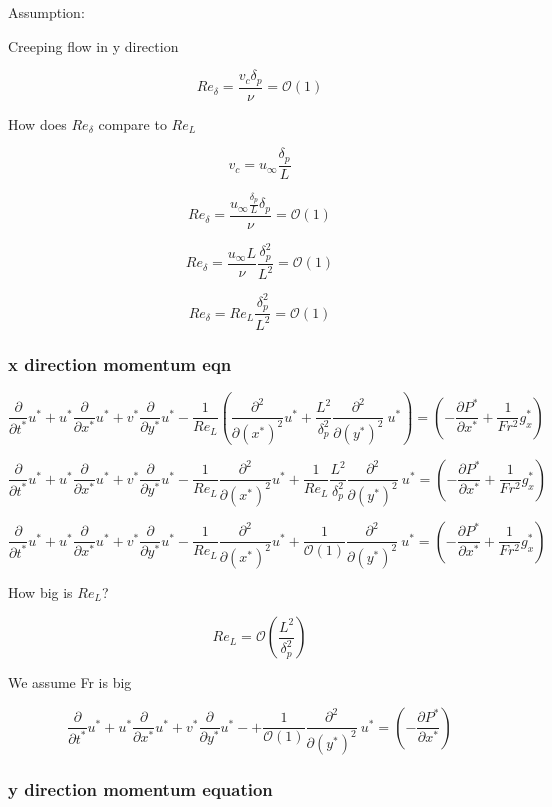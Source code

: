 \documentclass[11pt]{article}
\begin{document}
Assumption:

Creeping flow in y direction

$$Re_\delta = \frac{v_c \delta_p}{\nu} = \mathcal{O}(1)$$

How does $Re_\delta$ compare to $Re_L$

$$v_c = u_\infty \frac{\delta_p}{L}$$

$$Re_\delta = \frac{u_\infty \frac{\delta_p}{L} \delta_p}{\nu} = \mathcal{O}(1)$$

$$Re_\delta = \frac{u_\infty  L}{\nu} \frac{\delta_p^2}{L^2} = \mathcal{O}(1)$$

$$Re_\delta = Re_L \frac{\delta_p^2}{L^2} = \mathcal{O}(1)$$

\subsubsection{x direction momentum eqn}

$$\frac{\partial }{\partial t^*} u^* + u^*  \frac{\partial}{\partial x^* } u^* + v^*  \frac{\partial}{\partial y^*} u^* - \frac{1}{Re_L}  ( \frac{\partial^2}{\partial (x^*)^2} u^* + \frac{L^2}{\delta_p^2} \frac{\partial^2}{\partial (y^*)^2} \ u^* ) =  ( -  \frac{\partial P^*}{\partial x^*} + \frac{1}{Fr^2}g_x^* )$$

$$\frac{\partial }{\partial t^*} u^* + u^*  \frac{\partial}{\partial x^* } u^* + v^*  \frac{\partial}{\partial y^*} u^* -   \frac{1}{Re_L} \frac{\partial^2}{\partial (x^*)^2} u^* + \frac{1}{Re_L} \frac{L^2}{\delta_p^2} \frac{\partial^2}{\partial (y^*)^2} \ u^*  =  ( -  \frac{\partial P^*}{\partial x^*} + \frac{1}{Fr^2}g_x^* )$$

$$\frac{\partial }{\partial t^*} u^* + u^*  \frac{\partial}{\partial x^* } u^* + v^*  \frac{\partial}{\partial y^*} u^* -   \frac{1}{Re_L} \frac{\partial^2}{\partial (x^*)^2} u^* + \frac{1}{\mathcal{O}(1)} \frac{\partial^2}{\partial (y^*)^2} \ u^*  =  ( -  \frac{\partial P^*}{\partial x^*} + \frac{1}{Fr^2}g_x^* )$$

How big is $Re_L$?

$$Re_L = \mathcal{O} (\frac{L^2}{\delta_p^2})$$

We assume Fr is big 

$$\frac{\partial }{\partial t^*} u^* + u^*  \frac{\partial}{\partial x^* } u^* + v^*  \frac{\partial}{\partial y^*} u^* -  + \frac{1}{\mathcal{O}(1)} \frac{\partial^2}{\partial (y^*)^2} \ u^*  =  ( -  \frac{\partial P^*}{\partial x^*} )$$

\subsubsection{y direction momentum equation}
\end{document}
